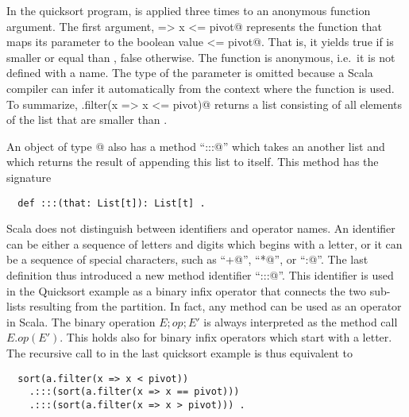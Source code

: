 \documentclass[11pt]{book}
\begin{document}
In the quicksort program, \verb@filter@ is applied three times to an
anonymous function argument.  The first argument,
\verb@x => x <= pivot@ represents the function that maps its parameter
\verb@x@ to the boolean value \verb@x <= pivot@. That is, it yields
true if \verb@x@ is smaller or equal than \verb@pivot@, false
otherwise. The function is anonymous, i.e.\ it is not defined with a
name. The type of the \verb@x@ parameter is omitted because a Scala
compiler can infer it automatically from the context where the
function is used. To summarize, \verb@xs.filter(x => x <= pivot)@
returns a list consisting of all elements of the list \verb@xs@ that are
smaller than \verb@pivot@.


An object of type \verb@List[t]@ also has a method ``\verb@:::@''
which takes an another list and which returns the result of appending this
list to itself. This method has the signature
\begin{verbatim}
  def :::(that: List[t]): List[t] .
\end{verbatim}
Scala does not distinguish between identifiers and operator names. An
identifier can be either a sequence of letters and digits which begins
with a letter, or it can be a sequence of special characters, such as
``\verb@+@'', ``\verb@*@'', or ``\verb@:@''.  The last definition thus
introduced a new method identifier ``\verb@:::@''.  This identifier is
used in the Quicksort example as a binary infix operator that connects
the two sub-lists resulting from the partition. In fact, any method
can be used as an operator in Scala.  The binary operation $E;op;E'$
is always interpreted as the method call $E.op(E')$. This holds also
for binary infix operators which start with a letter. The recursive call
to \verb@sort@ in the last quicksort example is thus equivalent to
\begin{verbatim}
  sort(a.filter(x => x < pivot))
    .:::(sort(a.filter(x => x == pivot)))
    .:::(sort(a.filter(x => x > pivot))) .
\end{verbatim}
\end{document}

